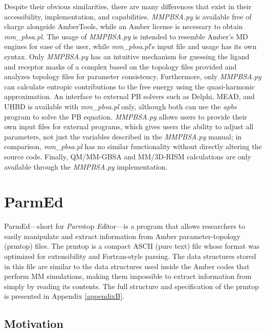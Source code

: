 Despite their obvious similarities, there are many differences that exist in
their accessibility, implementation, and capabilities. \emph{MMPBSA.py} is
available free of charge alongside AmberTools, while an Amber license is
necessary to obtain \emph{mm\_pbsa.pl}. The usage of \emph{MMPBSA.py} is
intended to resemble Amber’s MD engines for ease of the user, while
\emph{mm\_pbsa.pl}’s input file and usage has its own syntax. Only
\emph{MMPBSA.py} has an intuitive mechanism for guessing the ligand and receptor
masks of a complex based on the topology files provided and analyzes topology
files for parameter consistency. Furthermore, only \emph{MMPBSA.py} can
calculate entropic contributions to the free energy using the quasi-harmonic
approximation. An interface to external PB solvers such as Delphi, MEAD, and
UHBD is available with \emph{mm\_pbsa.pl} only, although both can use the
\emph{apbs} program to solve the PB equation. \emph{MMPBSA.py} allows users to
provide their own input files for external programs, which gives users the
ability to adjust all parameters, not just the variables described in the
\emph{MMPBSA.py} manual; in comparison, \emph{mm\_pbsa.pl} has no similar
functionality without directly altering the source code. Finally, QM/MM-GBSA and
MM/3D-RISM calculations are only available through the \emph{MMPBSA.py}
implementation.

\section{ParmEd}

ParmEd---short for \emph{Parm}top \emph{Ed}itor---is a program that allows
researchers to easily manipulate and extract information from Amber
parameter-topology (prmtop) files. The prmtop is a compact ASCII (\ie pure text)
file whose format was optimized for extensibility and Fortran-style parsing. The
data structures stored in this file are similar to the data structures used
inside the Amber codes that perform MM simulations, making them impossible to
extract information from simply by reading its contents. The full structure and
specification of the prmtop is presented in Appendix \ref{appendixB}.

\subsection{Motivation}

